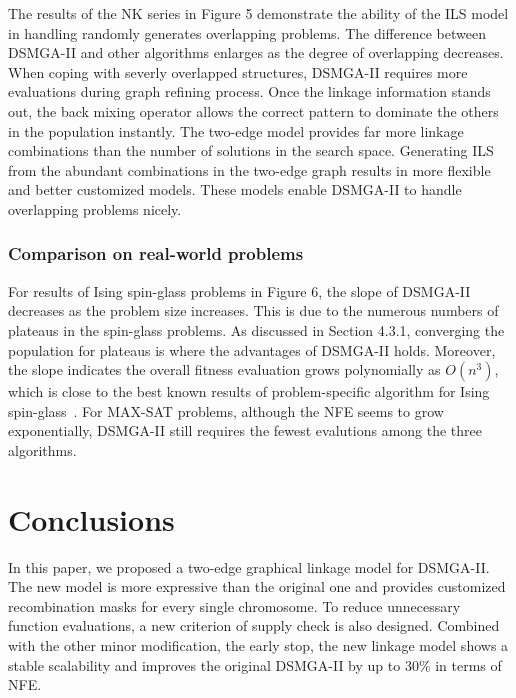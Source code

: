\documentclass{sig-alternate-05-2015}
\begin{document}
The results of the NK series in Figure 5 demonstrate the ability of the ILS model in handling randomly generates overlapping problems. 
The difference between DSMGA-II and other algorithms enlarges as the degree of overlapping decreases. 
When coping with severly overlapped structures, DSMGA-II requires more evaluations during graph refining process.
Once the linkage information stands out, the back mixing operator allows the correct pattern to dominate the others in the population instantly. 
The two-edge model provides far more linkage combinations than the number of solutions in the search space.
Generating ILS from the abundant combinations in the two-edge graph results in more flexible and better customized models.
These models enable DSMGA-II to handle overlapping problems nicely. 


\subsubsection{ Comparison on real-world problems }



For results of Ising spin-glass problems in Figure 6, the slope of DSMGA-II decreases as the problem size increases. 
This is due to the numerous numbers of plateaus in the spin-glass problems.
As discussed in Section 4.3.1, converging the population for plateaus is where the advantages of DSMGA-II holds.
Moreover, the slope indicates the overall fitness evaluation grows polynomially as $O(n^3)$, which is close to the best known results of problem-specific algorithm for Ising spin-glass~\cite{galluccio:pfaffian}.
For MAX-SAT problems, although the NFE seems to grow exponentially, DSMGA-II still requires the fewest evalutions among the three algorithms.



\section{Conclusions}
 
In this paper, we proposed a two-edge graphical linkage model for DSMGA-II. 
The new model is more expressive than the original one and provides customized recombination masks for every single chromosome. 
To reduce unnecessary function evaluations, a new criterion of supply check  is also designed. Combined with the other minor modification, the early stop, the new linkage model shows a stable scalability and improves the original DSMGA-II by up to 30\% in terms of NFE.
\end{document}
